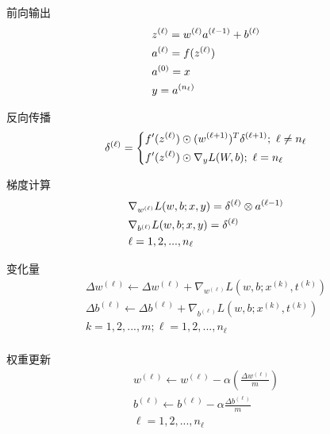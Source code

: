 \begin{frame}{前向输出}
\[\begin{gathered}
  {z^{(\ell )}} = {w^{(\ell )}}{a^{(\ell  - 1)}} + {b^{(\ell )}} \hfill \\
  {a^{(\ell )}} = f({z^{(\ell )}}) \hfill \\
  {a^{(0)}} = x \hfill \\
  y = {a^{({n_\ell })}} \hfill \\ 
\end{gathered} \]
\end{frame}

\begin{frame}{反向传播}
\[{\delta ^{(\ell )}} = \left\{ \begin{gathered}
  f'({z^{(\ell )}}) \odot {({w^{(\ell  + 1)}})^T}{\delta ^{(\ell  + 1)}};{\text{  }}\ell  \ne {n_\ell } \hfill \\
  f'({z^{(\ell )}}) \odot {\nabla _y}L(W,b);{\text{     }}\ell  = {n_\ell } \hfill \\ 
\end{gathered}  \right.\]
\end{frame}

\begin{frame}{梯度计算}
\[\begin{gathered}
  {\nabla _{{w^{(\ell )}}}}L(w,b;x,y) = {\delta ^{(\ell )}} \otimes {a^{(\ell  - 1)}} \hfill \\
  {\nabla _{{b^{(\ell )}}}}L(w,b;x,y) = {\delta ^{(\ell )}} \hfill \\
  \ell  = 1,2,...,{n_\ell } \hfill \\ 
\end{gathered} \]
\end{frame}

\begin{frame}{变化量}
\[\begin{gathered}
  \Delta {w^{(\ell )}} \leftarrow \Delta {w^{(\ell )}} + {\nabla _{{w^{(\ell )}}}}L\left( {w,b;{x^{(k)}},{t^{(k)}}} \right) \\ 
  \Delta {b^{(\ell )}} \leftarrow \Delta {b^{(\ell )}} + {\nabla _{{b^{(\ell )}}}}L\left( {w,b;{x^{(k)}},{t^{(k)}}} \right) \\ 
  k = 1,2,...,m;\ell  = 1,2,...,{n_\ell } \\ 
\end{gathered} \]
\end{frame}

\begin{frame}{权重更新}
\[\begin{gathered}
  {w^{(\ell )}} \leftarrow {w^{(\ell )}} - \alpha \left( {\frac{{\Delta {w^{(\ell )}}}}{m}} \right) \\ 
  {b^{(\ell )}} \leftarrow {b^{(\ell )}} - \alpha \frac{{\Delta {b^{(\ell )}}}}{m} \\ 
  \ell  = 1,2,...,{n_\ell }  \\
\end{gathered} \]
\end{frame}


